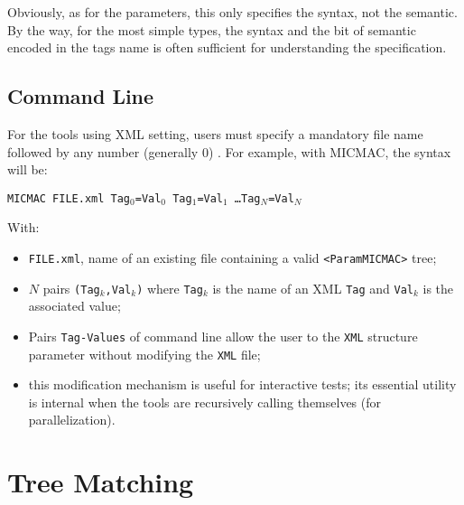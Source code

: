 Obviously, as for the parameters, this only specifies the syntax, not the
semantic. By the way, for the most simple types, the syntax and the bit
of semantic encoded in the tags name is often sufficient for understanding
the specification.


\subsection{Command Line}

\label{UTIL:SCPECIF:LIGCOM}

For the tools using XML setting, users must specify a mandatory
file  name followed by any number (generally $0$) . For example, with MICMAC, the syntax will be:


\vspace{0.2cm}
{\tt MICMAC FILE.xml Tag$_0$=Val$_0$ 
    Tag$_1$=Val$_1$  \dots   Tag$_N$=Val$_N$ }
\vspace{0.2cm}


With:

\begin{itemize}
    \item  {\tt FILE.xml}, name of an existing file containing a valid
           {\tt <ParamMICMAC>} tree;
    \item $N$ pairs {\tt (Tag$_k$,Val$_k$)} where {\tt Tag$_k$} 
          is the name of an XML {\tt Tag} and {\tt Val$_k$} is the
           associated  value;

     \item  Pairs {\tt Tag-Values} of command line  allow  the 
            user to  %
              the  {\tt XML} structure parameter without
            modifying the   {\tt XML}  file;

      \item  this modification mechanism is useful for interactive tests;
             its essential utility is internal when the tools are recursively
             calling themselves (for parallelization).
     
\end{itemize}


\section{Tree Matching}

